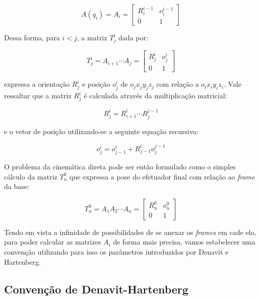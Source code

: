 \begin{equation}
    A(q_i) = A_i = \begin{bmatrix}
        R^{i-1}_i & o^{i-1}_i \\
        0         & 1
    \end{bmatrix}
\end{equation}

Dessa forma, para $i < j$, a matriz $T_j^i$ dada por:

\begin{equation}
    T_j^i = A_{i+1} \cdots A_j = \begin{bmatrix}
        R^i_j & o^i_j \\
        0     & 1
    \end{bmatrix}
\end{equation}

expressa a orientação $R^i_j$ e posição $o^i_j$ de $o_j x_j y_j z_j$ com
relação a $o_i x_i y_i z_i$. Vale ressaltar que a matriz $R^i_j$ é calculada
através da multiplicação matricial:

\begin{equation}
    R^i_j = R^i_{i+1} \cdots R^{j-1}_j
\end{equation}

e o vetor de posição utilizando-se a seguinte equação recursiva:

\begin{equation}
    o^i_j = o^i_{j-1} + R^i_{j-1}o^{j-1}_j
\end{equation}

O problema da cinemática direta pode ser então formulado como o simples cálculo
da matriz $T^0_n$ que expressa a pose do efetuador final com relação ao
\emph{frame} da base:

\begin{equation}\label{eq:fkine}
    T^0_n = A_1 A_2 \cdots A_n = \begin{bmatrix}
        R^0_n & o^0_n \\
        0     & 1
    \end{bmatrix}
\end{equation}

Tendo em vista a infinidade de possibilidades de se anexar os \emph{frames} em
cade elo, para poder calcular as matrizes $A_i$ de forma mais precisa, vamos
estabelecer uma convenção utilizando para isso os parâmetros introduzidos por
Denavit e Hartenberg.

\subsection{Convenção de Denavit-Hartenberg}

